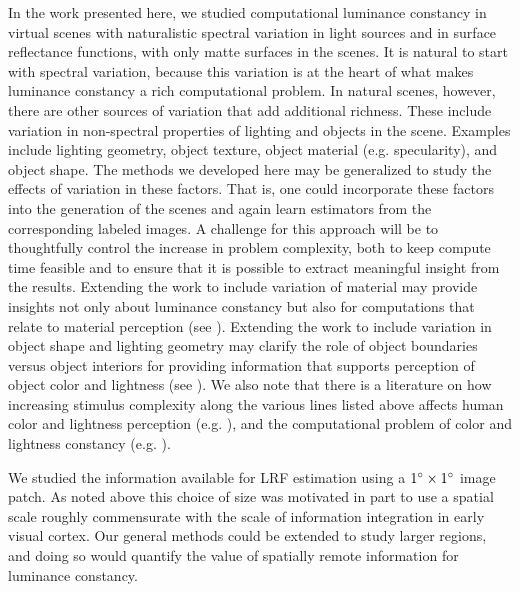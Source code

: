 \documentclass{jov}
\begin{document}
In the work presented here, we studied computational luminance constancy in virtual scenes with naturalistic spectral variation in light sources and in surface reflectance functions, with only matte surfaces in the scenes. It is natural to start with spectral variation, because this variation is at the heart of what makes luminance constancy a rich computational problem. In natural scenes, however, there are other sources of variation that add additional richness. These include variation in non-spectral properties of lighting and objects in the scene. Examples include lighting geometry, object texture, object material (e.g. specularity), and object shape. The methods we developed here may be generalized to study the effects of variation in these factors. That is, one could incorporate these factors into the generation of the scenes and again learn estimators from the corresponding labeled images. A challenge for this approach will be to thoughtfully control the increase in problem complexity, both to keep compute time feasible and to ensure that it is possible to extract meaningful insight from the results. Extending the work to include variation of material may provide insights not only about luminance constancy but also for computations that relate to material perception (see ). Extending the work to include variation in object shape and lighting geometry may clarify the role of object boundaries versus object interiors for providing information that supports perception of object color and lightness (see ). We also note that there is a literature on how increasing stimulus complexity along the various lines listed above affects human color and lightness perception (e.g. ), and the computational problem of color and lightness constancy (e.g. ).


We studied the information available for LRF estimation using a $1\degree \times 1 \degree$ image patch. As noted above this choice of size was motivated in part to use a spatial scale roughly commensurate with the scale of information integration in early visual cortex. Our general methods could be extended to study larger regions, and doing so would quantify the value of spatially remote information for luminance constancy. 
\end{document}
